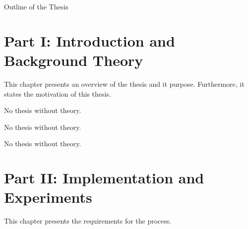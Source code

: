 \clearemptydoublepage

{}

\begin{center}
	\huge{Outline of the Thesis}
\end{center}




\section*{Part I: Introduction and Background Theory}

  \vspace{1mm}

\noindent  This chapter presents an overview of the thesis and it purpose. Furthermore, it states the motivation of this thesis.  \\

  \vspace{1mm}

\noindent  No thesis without theory.   \\

  \vspace{1mm}

\noindent  No thesis without theory.   \\

  \vspace{1mm}

\noindent  No thesis without theory.   \\

\section*{Part II: Implementation and Experiments}

  \vspace{1mm}

\noindent  This chapter presents the requirements for the process. \\

  \vspace{1mm}

